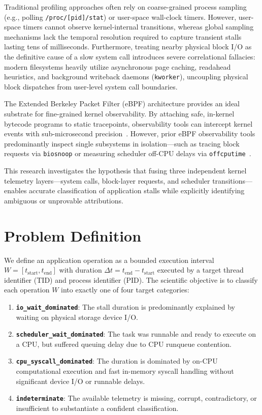 \documentclass[conference]{IEEEtran}
\begin{document}
Traditional profiling approaches often rely on coarse-grained process sampling (e.g., polling \texttt{/proc/[pid]/stat}) or user-space wall-clock timers. However, user-space timers cannot observe kernel-internal transitions, whereas global sampling mechanisms lack the temporal resolution required to capture transient stalls lasting tens of milliseconds. Furthermore, treating nearby physical block I/O as the definitive cause of a slow system call introduces severe correlational fallacies: modern filesystems heavily utilize asynchronous page caching, readahead heuristics, and background writeback daemons (\texttt{kworker}), uncoupling physical block dispatches from user-level system call boundaries.

The Extended Berkeley Packet Filter (eBPF) architecture provides an ideal substrate for fine-grained kernel observability. By attaching safe, in-kernel bytecode programs to static tracepoints, observability tools can intercept kernel events with sub-microsecond precision~\cite{linux_bpf_docs}. However, prior eBPF observability tools predominantly inspect single subsystems in isolation—such as tracing block requests via \texttt{biosnoop} or measuring scheduler off-CPU delays via \texttt{offcputime}~\cite{gregg2019bpf}. 

This research investigates the hypothesis that fusing three independent kernel telemetry layers—system calls, block-layer requests, and scheduler transitions—enables accurate classification of application stalls while explicitly identifying ambiguous or unprovable attributions.

\section{Problem Definition}
We define an application operation as a bounded execution interval $W = [t_{\text{start}}, t_{\text{end}}]$ with duration $\Delta t = t_{\text{end}} - t_{\text{start}}$ executed by a target thread identifier (TID) and process identifier (PID). The scientific objective is to classify each operation $W$ into exactly one of four target categories:
\begin{enumerate}
    \item \textbf{\texttt{io\_wait\_dominated}}: The stall duration is predominantly explained by waiting on physical storage device I/O.
    \item \textbf{\texttt{scheduler\_wait\_dominated}}: The task was runnable and ready to execute on a CPU, but suffered queuing delay due to CPU runqueue contention.
    \item \textbf{\texttt{cpu\_syscall\_dominated}}: The duration is dominated by on-CPU computational execution and fast in-memory syscall handling without significant device I/O or runnable delays.
    \item \textbf{\texttt{indeterminate}}: The available telemetry is missing, corrupt, contradictory, or insufficient to substantiate a confident classification.
\end{enumerate}
\end{document}
